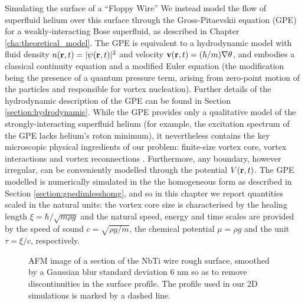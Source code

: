 \begin{chapter}{\label{cha:afm}Simulating the surface of a ``Floppy Wire''}
We instead model the flow of superfluid helium over this surface through the Gross-Pitaevskii equation (GPE) \cite{RobertsBerloff} for a weakly-interacting Bose superfluid, as described in Chapter \ref{cha:theoretical_model}. The GPE is equivalent to a hydrodynamic model with fluid density $n({\bf r},t)=|\psi({\bf r},t)|^2$ and velocity ${\bf v}({\bf r},t)=(\hbar/m)\nabla \theta$, and embodies a classical 
continuity equation and a modified Euler equation (the modification being the presence of a quantum pressure term, arising from zero-point motion of the particles {and responsible for vortex nucleation}). Further details of the hydrodynamic description of the GPE can be found in Section \ref{section:hydrodynamic}.
While the GPE provides only a qualitative model of the strongly-interacting superfluid helium (for example, the excitation spectrum of the GPE lacks helium's roton minimum), it nevertheless contains the key microscopic physical ingredients of our problem: finite-size vortex core, vortex interactions and vortex reconnections \cite{RobertsBerloff}.  Furthermore, any boundary, however irregular, can be conveniently modelled through the potential $V({\bf r},t)$. The GPE modelled is numerically simulated in the the homogeneous form as described in Section \ref{section:gpedimlesshomg}, and so in this chapter we report quantities scaled in the natural units: the vortex core size is characterised by the healing length $\xi=\hbar/\sqrt{m \rho g}$ and the natural speed, energy and time scales are provided by the speed of sound $c=\sqrt{\rho g/m}$, the chemical potential $\mu=\rho g$ and the unit $\tau=\xi/c$, respectively. 

\begin{figure}
  \centering
  \caption{\label{fig:afmsmooth}AFM image of a section of the NbTi wire rough surface, smoothed by a Gaussian blur standard deviation 6 nm so as to remove discontinuities in the surface profile. The profile used in our 2D simulations is marked by a dashed line.}
\end{figure}


\end{chapter}
